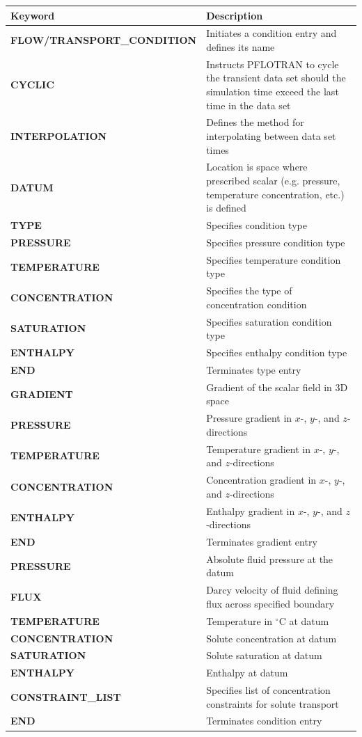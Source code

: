 \documentclass[12pt]{article}
\begin{document}
\begin{center}
\begin{tabularx}{\linewidth}{lX}
\toprule[1.5pt]
\bf Keyword & \bf Description\\
\midrule
\bf FLOW/TRANSPORT\_CONDITION & Initiates a condition entry and defines its name\\
\midrule
\bf CYCLIC & Instructs PFLOTRAN to cycle the transient data set should the simulation time exceed the last time in the data set\\
\midrule
\bf INTERPOLATION & Defines the method for interpolating between data set times\\
\midrule
\bf DATUM & Location is space where prescribed scalar (e.g. pressure, temperature concentration, etc.) is defined\\
\midrule
\bf TYPE & Specifies condition type\\
\midrule
\bf PRESSURE & Specifies pressure condition type\\
 \bf TEMPERATURE & Specifies temperature condition type\\
    \bf CONCENTRATION & Specifies the type of concentration condition\\
    \bf SATURATION & Specifies saturation condition type\\
    \bf ENTHALPY & Specifies enthalpy condition type\\
    \bf END & Terminates type entry\\
\toprule[1.5pt]
\bf GRADIENT & Gradient of the scalar field in 3D space\\
\midrule
\bf PRESSURE & Pressure gradient in $x$-, $y$-, and $z$-directions\\
\bf TEMPERATURE & Temperature gradient in $x$-, $y$-, and $z$-directions\\
\bf CONCENTRATION & Concentration gradient in $x$-, $y$-, and $z$-directions\\
\bf ENTHALPY & Enthalpy gradient in $x$-, $y$-, and $z$-directions\\
\bf END & Terminates gradient entry\\
\toprule[1.5pt]
\bf PRESSURE & Absolute fluid pressure at the datum\\
\bf FLUX & Darcy velocity of fluid defining flux across specified boundary\\
\bf TEMPERATURE & Temperature in $^\circ$C at datum\\
\bf CONCENTRATION & Solute concentration at datum\\
\bf SATURATION & Solute saturation at datum\\
\bf ENTHALPY & Enthalpy at datum\\
\bf CONSTRAINT\_LIST & Specifies list of concentration constraints for solute transport\\
\bf END & Terminates condition entry\\
\bottomrule[1.5pt]
\end{tabularx}
\end{center}
\end{document}
